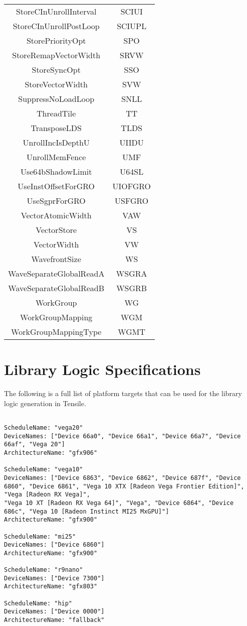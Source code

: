 \documentclass[]{article}
\begin{document}
\begin{center}
\begin{small}
\begin{longtable}{ |c|c| }
 StoreCInUnrollInterval & SCIUI \\
 StoreCInUnrollPostLoop & SCIUPL \\
 StorePriorityOpt & SPO \\
 StoreRemapVectorWidth & SRVW \\
 StoreSyncOpt & SSO \\
 StoreVectorWidth & SVW \\
 SuppressNoLoadLoop & SNLL \\
 ThreadTile & TT \\
 TransposeLDS & TLDS \\
 UnrollIncIsDepthU & UIIDU \\
 UnrollMemFence & UMF \\
 Use64bShadowLimit & U64SL \\
 UseInstOffsetForGRO & UIOFGRO \\
 UseSgprForGRO & USFGRO \\
 VectorAtomicWidth & VAW \\
 VectorStore & VS \\
 VectorWidth & VW \\
 WavefrontSize & WS \\
 WaveSeparateGlobalReadA & WSGRA \\
 WaveSeparateGlobalReadB & WSGRB \\
 WorkGroup & WG \\
 WorkGroupMapping & WGM \\
 WorkGroupMappingType & WGMT \\
 \hline
\end{longtable}
\end{small}
\end{center}

\section{Library Logic Specifications}
\label{sec:appendixD}

The following is a full list of platform targets that can be used for the library logic generation in Tensile.


\begin{verbatim}

ScheduleName: "vega20"
DeviceNames: ["Device 66a0", "Device 66a1", "Device 66a7", "Device 66af", "Vega 20"]
ArchitectureName: "gfx906"

ScheduleName: "vega10"
DeviceNames: ["Device 6863", "Device 6862", "Device 687f", "Device 6860", "Device 6861", "Vega 10 XTX [Radeon Vega Frontier Edition]", "Vega [Radeon RX Vega]",
"Vega 10 XT [Radeon RX Vega 64]", "Vega", "Device 6864", "Device 686c", "Vega 10 [Radeon Instinct MI25 MxGPU]"]
ArchitectureName: "gfx900"

ScheduleName: "mi25"
DeviceNames: ["Device 6860"]
ArchitectureName: "gfx900"

ScheduleName: "r9nano"
DeviceNames: ["Device 7300"]
ArchitectureName: "gfx803"

ScheduleName: "hip"
DeviceNames: ["Device 0000"]
ArchitectureName: "fallback"

\end{verbatim}
\end{document}
